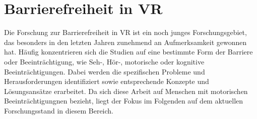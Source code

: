\section{Barrierefreiheit in VR} 

Die Forschung zur Barrierefreiheit in VR ist ein noch junges Forschungsgebiet, das besonders in den letzten Jahren zunehmend an Aufmerksamkeit gewonnen hat. Häufig konzentrieren sich die Studien auf eine bestimmte Form der Barriere oder Beeinträchtigung, wie Seh-, Hör-, motorische oder kognitive Beeinträchtigungen. Dabei werden die spezifischen Probleme und Herausforderungen identifiziert sowie entsprechende Konzepte und Lösungsansätze erarbeitet. Da sich diese Arbeit auf Menschen mit motorischen Beeinträchtigungnen bezieht, liegt der Fokus im Folgenden auf dem aktuellen Forschungsstand in diesem Bereich.

